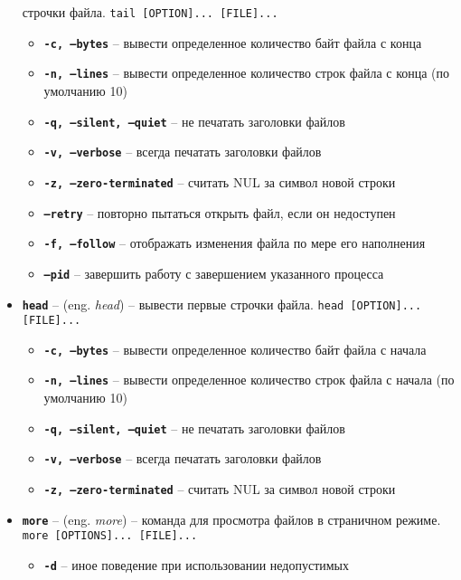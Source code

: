 \documentclass[12pt, a4paper]{article}
\begin{document}
\begin{itemize}
    строчки файла. \texttt{tail [OPTION]... [FILE]...}
  \begin{itemize}
    \item \textbf{\texttt{-c, --bytes}} -- вывести определенное количество байт
      файла с конца
    \item \textbf{\texttt{-n, --lines}} -- вывести определенное количество
      строк файла с конца (по умолчанию 10)
    \item \textbf{\texttt{-q, --silent, --quiet}} -- не печатать заголовки
      файлов
    \item \textbf{\texttt{-v, --verbose}} -- всегда печатать заголовки файлов
    \item \textbf{\texttt{-z, --zero-terminated}} -- считать NUL за символ
      новой строки
    \item \textbf{\texttt{--retry}} -- повторно пытаться открыть файл, если он
      недоступен
    \item \textbf{\texttt{-f, --follow}} -- отображать изменения файла по мере
      его наполнения
    \item \textbf{\texttt{--pid}} -- завершить работу с завершением указанного
      процесса
  \end{itemize}
  \item \textbf{\texttt{head}} -- (eng. \textit{head}) -- вывести первые строчки
    файла. \texttt{head [OPTION]... [FILE]...}
  \begin{itemize}
    \item \textbf{\texttt{-c, --bytes}} -- вывести определенное количество байт
      файла с начала
    \item \textbf{\texttt{-n, --lines}} -- вывести определенное количество
      строк файла с начала (по умолчанию 10)
    \item \textbf{\texttt{-q, --silent, --quiet}} -- не печатать заголовки
      файлов
    \item \textbf{\texttt{-v, --verbose}} -- всегда печатать заголовки файлов
    \item \textbf{\texttt{-z, --zero-terminated}} -- считать NUL за символ
      новой строки
  \end{itemize}
  \item \textbf{\texttt{more}} -- (eng. \textit{more}) -- команда для просмотра
    файлов в страничном режиме. \texttt{more [OPTIONS]... [FILE]...}
  \begin{itemize}
    \item \textbf{\texttt{-d}} -- иное поведение при использовании недопустимых

\end{itemize}
\end{itemize}
\end{document}
